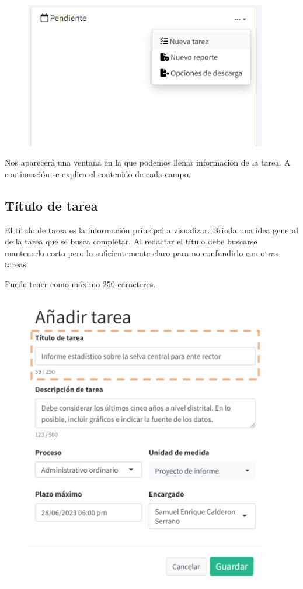 \documentclass[
  letterpaper,
  DIV=11,
  numbers=noendperiod]{scrreprt}
\begin{document}
\begin{figure}

{\centering \includegraphics[width=4.16667in,height=\textheight]{./img/manual-user/pending-menu.png}

}

\end{figure}

Nos aparecerá una ventana en la que podemos llenar información de la
tarea. A continuación se explica el contenido de cada campo.

\hypertarget{tuxedtulo-de-tarea}{%
\subsection{Título de tarea}\label{tuxedtulo-de-tarea}}

El título de tarea es la información principal a visualizar. Brinda una
idea general de la tarea que se busca completar. Al redactar el título
debe buscarse mantenerlo corto pero lo suficientemente claro para no
confundirlo con otras tareas.

Puede tener como máximo 250 caracteres.

\begin{figure}

{\centering \includegraphics[width=4.16667in,height=\textheight]{./img/manual-user/new-task-title.png}

}

\end{figure}
\end{document}
